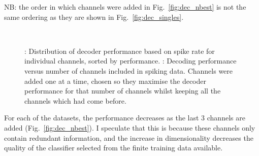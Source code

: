 NB: the order in which channels were added in Fig.~\ref{fig:dec_nbest} is not the same ordering as they are shown in Fig.~\ref{fig:dec_singles}.

\begin{figure}[htbp]
    ~~
    \caption{
\protect{}: Distribution of decoder performance based on spike rate for individual channels, sorted by performance.
\protect{}: Decoding performance versus number of channels included in spiking data.
Channels were added one at a time, chosen so they maximise the decoder performance for that number of channels whilst keeping all the channels which had come before.
}
    \label{fig:dec_n}
\end{figure}

For each of the datasets, the performance decreases as the last 3 channels are added (Fig.~\ref{fig:dec_nbest}).
I speculate that this is because these channels only contain redundant information, and the increase in dimensionality decreases the quality of the classifier selected from the finite training data available.


